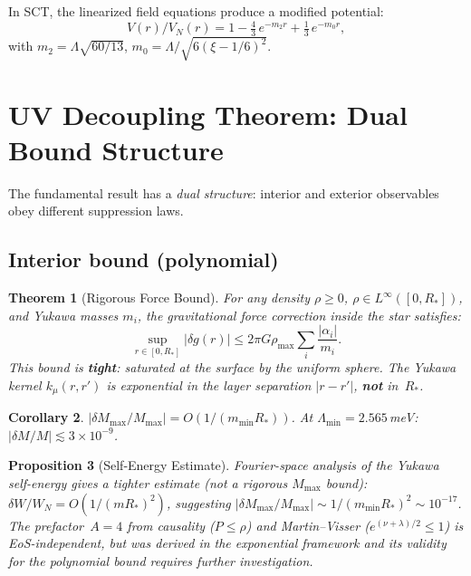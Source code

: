 \documentclass[12pt,a4paper]{article}
\newtheorem{theorem}{Theorem}[section]
\newtheorem{corollary}[theorem]{Corollary}
\newtheorem{proposition}[theorem]{Proposition}
\newcommand{\Lam}{\Lambda}
\newcommand{\Mmax}{M_{\mathrm{max}}}
\newcommand{\Rstar}{R_*}
\begin{document}
In SCT, the linearized field equations produce a modified potential:
\begin{equation}\label{eq:yukawa}
  V(r)/V_N(r) = 1 - \tfrac{4}{3}\,e^{-m_2 r} + \tfrac{1}{3}\,e^{-m_0 r},
\end{equation}
with $m_2 = \Lam\sqrt{60/13}$, $m_0 = \Lam/\sqrt{6(\xi-1/6)^2}$.

\section{UV Decoupling Theorem: Dual Bound Structure}
\label{sec:theorem}

The fundamental result has a \emph{dual structure}: interior and
exterior observables obey different suppression laws.

\subsection{Interior bound (polynomial)}

\begin{theorem}[Rigorous Force Bound]
\label{thm:force-bound}
For any density $\rho \geq 0$, $\rho \in L^\infty([0,\Rstar])$, and
Yukawa masses $m_i$, the gravitational force correction inside the
star satisfies:
\begin{equation}\label{eq:force-bound}
  \sup_{r \in [0,\Rstar]} |\delta g(r)|
  \leq 2\pi G \rho_{\max} \sum_i \frac{|\alpha_i|}{m_i}.
\end{equation}
This bound is \textbf{tight}: saturated at the surface by the uniform
sphere. The Yukawa kernel $k_\mu(r,r')$ is exponential in the
\emph{layer separation} $|r-r'|$, \textbf{not} in~$\Rstar$.
\end{theorem}

\begin{corollary}
$|\delta\Mmax/\Mmax| = O(1/(m_{\min}\Rstar))$.
At $\Lambda_{\min} = 2.565$\,meV: $|\delta M/M| \lesssim 3 \times 10^{-9}$.
\end{corollary}

\begin{proposition}[Self-Energy Estimate]
\label{prop:self-energy}
Fourier-space analysis of the Yukawa self-energy gives a tighter
\emph{estimate} (not a rigorous $M_{\max}$ bound):
$\delta W/W_N = O(1/(m\Rstar)^2)$, suggesting
$|\delta\Mmax/\Mmax| \sim 1/(m_{\min}\Rstar)^2 \sim 10^{-17}$.
The prefactor~$A = 4$ from causality ($P \leq \rho$) and
Martin--Visser ($e^{(\nu+\lambda)/2} \leq 1$) is EoS-independent,
but was derived in the exponential framework and its validity
for the polynomial bound requires further investigation.
\end{proposition}
\end{document}
